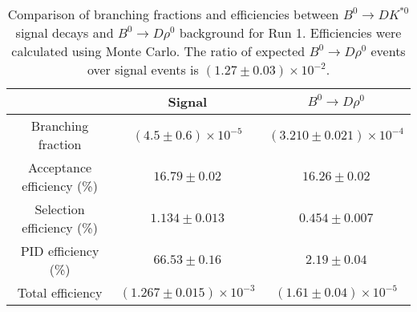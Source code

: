 \begin{table}
    \centering
    \begin{tabular}{ccc}
        \toprule
        & Signal & $B^0 \to D\rho^0$ \\
        \midrule
        Branching fraction & $(4.5 \pm 0.6) \times 10^{-5}$ & $(3.210 \pm 0.021) \times 10^{-4}$ \\
        Acceptance efficiency (\%) & $16.79 \pm 0.02$ & $16.26 \pm 0.02$ \\
        Selection efficiency (\%) & $1.134 \pm 0.013$ & $0.454 \pm 0.007$ \\
        PID efficiency (\%) & $66.53 \pm 0.16$ & $2.19 \pm 0.04$ \\
        \midrule
        Total efficiency & $(1.267 \pm 0.015) \times 10^{-3}$ & $(1.61 \pm 0.04) \times 10^{-5}$ \\
        \bottomrule
        \end{tabular}
        \caption{Comparison of branching fractions and efficiencies between $B^0 \to DK^{*0}$ signal decays and $B^0 \to D\rho^0$ background for Run 1. Efficiencies were calculated using Monte Carlo. The ratio of expected $B^0 \to D\rho^0$ events over signal events is $(1.27 \pm 0.03) \times 10^{-2}$.}
\label{tab:rho_efficiency_run1}
\end{table}
